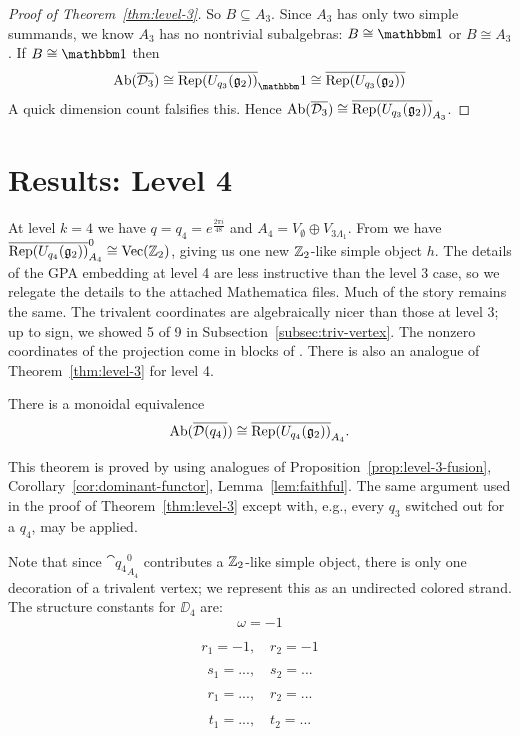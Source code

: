 \begin{proof}[Proof of Theorem~\ref{thm:level-3}]
    So $B\subseteq A_3$. Since $A_3$ has only two simple summands, we know $A_3$ has no nontrivial subalgebras: $B\cong \unit$ or $B\cong A_3$.
    If $B\cong \unit$ then
    \[
        \Ab(\ol{\DD_3}) \cong \ol{\Rep(U_{q_3}(\gg_2))}_\unit \cong \ol{\Rep(U_{q_3}(\gg_2))}
    \]
    A quick dimension count falsifies this. Hence $\operatorname{Ab}(\overline{\mathcal{D}_3}) \cong \overline{ \operatorname{Rep}(U_{q_3}(\mathfrak{g}_2))}_{A_3}$.
\end{proof}








\section{Results: Level 4}
At level $k=4$ we have $q = q_4 = e^{\frac{2\pi i}{48}}$ and $A_4=V_\emptyset \oplus V_{3\Lambda_1}$. From \cite{DMNO} we have $\overline{\operatorname{Rep}(U_{q_4}(\mathfrak{g}_2))}_{A_4}^0 \cong \operatorname{Vec}(\mathbb{Z}_2)$, giving us one new $\mathbb{Z}_2$-like simple object $h$. The details of the GPA embedding at level 4 are less instructive than the level 3 case, so we relegate the details to the attached Mathematica files. Much of the story remains the same. The trivalent coordinates are algebraically nicer than those at level 3; up to sign, we showed 5 of 9 in Subsection~\ref{subsec:triv-vertex}. The nonzero coordinates of the projection come in blocks of . There is also an analogue of Theorem~\ref{thm:level-3} for level 4.

\begin{theorem}\label{thm:level-4}
    There is a monoidal equivalence
    \[
        \operatorname{Ab}(\overline{\mathcal{D}(q_4)}) \cong \overline{ \operatorname{Rep}(U_{q_4}(\mathfrak{g}_2))}_{A_4}.
    \]
\end{theorem}

This theorem is proved by using analogues of Proposition~\ref{prop:level-3-fusion}, Corollary~\ref{cor:dominant-functor}, Lemma~\ref{lem:faithful}.
The same argument used in the proof of Theorem~\ref{thm:level-3} except with, e.g., every $q_3$ switched out for a $q_4$, may be applied.

Note that since $\cat{q_4}_{A_4}^0$ contributes a $\mathbb{Z}_2$-like simple object, there is only one decoration of a trivalent vertex;
we represent this as an undirected colored strand.
The structure constants for $\DD_4$ are:
\begin{equation*}
    \omega = -1
\end{equation*}

\begin{equation*}
    r_1 = -1, \quad r_2 = -1
\end{equation*}

\begin{equation*}
    s_1 = ..., \quad s_2 = ...
\end{equation*}

\begin{equation*}
    r_1 = ..., \quad r_2 = ...
\end{equation*}

\begin{equation*}
    t_1 = ..., \quad t_2 = ...
\end{equation*}






